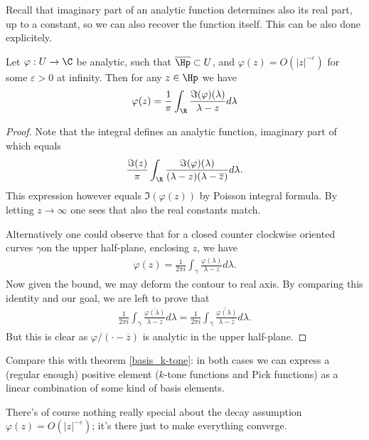 Recall that imaginary part of an analytic function determines also its real part, up to a constant, so we can also recover the function itself. This can be also done explicitely.

\begin{lause}
	Let $\varphi : U \to \C$ be analytic, such that $\overline{\Hp} \subset U$, and $\varphi(z) = O(|z|^{-\varepsilon})$ for some $\varepsilon > 0$ at infinity. Then for any $z \in \Hp$ we have
	\begin{align*}
		\varphi(z) = \frac{1}{\pi}\int_{\R} \frac{\Im(\varphi)(\lambda)}{\lambda - z} d \lambda
	\end{align*}
\end{lause}
\begin{proof}
	Note that the integral defines an analytic function, imaginary part of which equals
	\begin{align*}
		\frac{\Im(z)}{\pi}\int_{\R} \frac{\Im(\varphi)(\lambda)}{(\lambda - z)(\lambda - \overline{z})} d \lambda.
	\end{align*}
	This expression however equals $\Im(\varphi(z))$ by Poisson integral formula. By letting $z \to \infty$ one sees that also the real constants match.

	Alternatively one could observe that for a closed counter clockwise oriented curves $\gamma $on the upper half-plane, enclosing $z$, we have
	\begin{align*}
		\varphi(z) = \frac{1}{2\pi i}\int_{\gamma} \frac{\varphi(\lambda)}{\lambda - z} d \lambda.
	\end{align*}
	Now given the bound, we may deform the contour to real axis. By comparing this identity and our goal, we are left to prove that
	\begin{align*}
		\frac{1}{2\pi i}\int_{\gamma} \frac{\overline{\varphi(\lambda)}}{\lambda - z} d \lambda = \frac{1}{2\pi i} \overline{\int_{\gamma} \frac{\varphi(\lambda)}{\lambda - \overline{z}} d \lambda}.
	\end{align*}
	But this is clear as $\varphi/(\cdot - \overline{z})$ is analytic in the upper half-plane.
\end{proof}

Compare this with theorem \ref{basis_k-tone}: in both cases we can express a (regular enough) positive element ($k$-tone functions and Pick functions) as a linear combination of some kind of basis elements.

There's of course nothing really special about the decay assumption $\varphi(z) = O(|z|^{-\varepsilon})$; it's there just to make everything converge.

